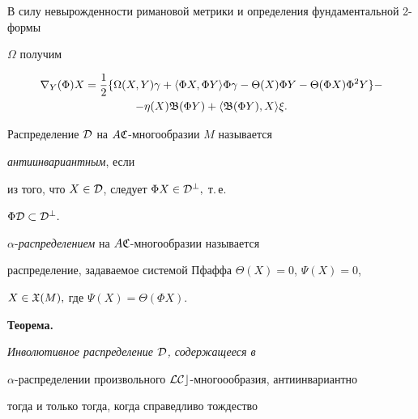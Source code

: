 В силу невырожденности римановой метрики и определения фундаментальной 2-формы 


$\Omega$ получим


\begin{multline}


\nabla_Y(\Phi)X=


\frac 12 \{ \Omega(X,Y)\gamma +


\langle \Phi X,\Phi Y \rangle \Phi\gamma - 


\Theta (X) \Phi Y - \Theta (\Phi X) \Phi^2 Y \}- \\


-\eta (X) \frak B(\Phi Y) +


\langle \frak B(\Phi Y),X \rangle \xi.


\end{multline}





\begin{defn}


Распределение $\cal D$ на $A\frak C$-многообразии $M$ называется 


{\it антиинвариантным}, если 


из того, что $X\in\cal D$, следует $\Phi X\in\cal D^{\bot},$ т.\,е.


$\Phi\cal D\subset\cal D^{\bot}.$ 


\end{defn}





\begin{defn}


$\alpha$-{\it распределением} на $A\frak C$-многообразии называется 


распределение, задаваемое системой Пфаффа $\Theta(X)=0$, $\Psi(X)=0$,


$X\in\frak X(M),$ где $\Psi(X)=\Theta (\Phi X).$


\end{defn}





{\bf Теорема.}


{\it Инволютивное распределение $\cal D$, содержащееся в 


$\alpha$-распределении произвольного $\cal LCc$-многоообразия, антиинвариантно 


тогда и только тогда, когда справедливо тождество}


$$



